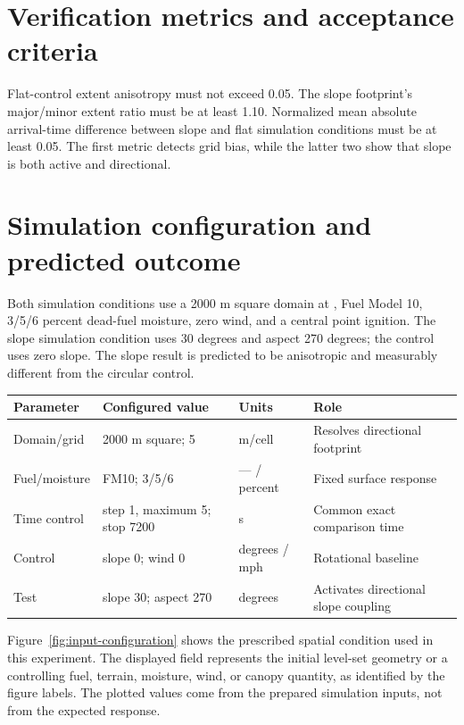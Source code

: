 \section{Verification metrics and acceptance criteria}

Flat-control extent anisotropy must not exceed 0.05. The slope footprint's major/minor extent ratio must be at least 1.10. Normalized mean absolute arrival-time difference between slope and flat simulation conditions must be at least 0.05. The first metric detects grid bias, while the latter two show that slope is both active and directional.

\section{Simulation configuration and predicted outcome}

Both simulation conditions use a 2000 m square domain at \CellSize{}, Fuel Model 10, 3/5/6 percent dead-fuel moisture, zero wind, and a central point ignition. The slope simulation condition uses 30 degrees and aspect 270 degrees; the control uses zero slope. The slope result is predicted to be anisotropic and measurably different from the circular control.

\begin{center}\begin{tabular}{p{}p{}p{}p{}}\toprule
Parameter & Configured value & Units & Role \\
\midrule Domain/grid & 2000 m square; 5 & m/cell & Resolves directional footprint \\
Fuel/moisture & FM10; 3/5/6 & --- / percent & Fixed surface response \\
Time control & step 1, maximum 5; stop 7200 & s & Common exact comparison time \\
Control & slope 0; wind 0 & degrees / mph & Rotational baseline \\
Test & slope 30; aspect 270 & degrees & Activates directional slope coupling \\
\bottomrule\end{tabular}\end{center}

Figure~\ref{fig:input-configuration} shows the prescribed spatial condition used in this experiment. The displayed field represents the initial level-set geometry or a controlling fuel, terrain, moisture, wind, or canopy quantity, as identified by the figure labels. The plotted values come from the prepared simulation inputs, not from the expected response.


